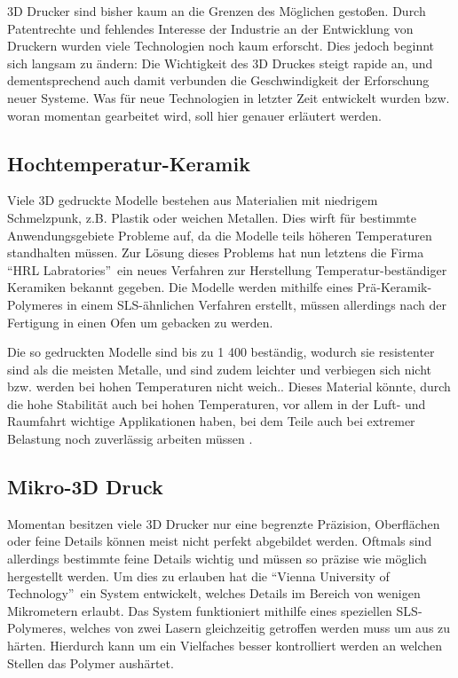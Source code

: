 3D Drucker sind bisher kaum an die Grenzen des Möglichen gestoßen. Durch Patentrechte und fehlendes Interesse der Industrie an der Entwicklung von Druckern wurden viele Technologien noch kaum erforscht. Dies jedoch beginnt sich langsam zu ändern: Die Wichtigkeit des 3D Druckes steigt rapide an, und dementsprechend auch damit verbunden die Geschwindigkeit der Erforschung neuer Systeme. Was für neue Technologien in letzter Zeit entwickelt wurden bzw. woran momentan gearbeitet wird, soll hier genauer erläutert werden.

\subsection{Hochtemperatur-Keramik}
Viele 3D gedruckte Modelle bestehen aus Materialien mit niedrigem Schmelzpunk, z.B. Plastik oder weichen Metallen. Dies wirft für bestimmte Anwendungsgebiete Probleme auf, da die Modelle teils höheren Temperaturen standhalten müssen. Zur Lösung dieses Problems hat nun letztens die Firma \textquotedblleft HRL Labratories\textquotedblright ~ein neues Verfahren zur Herstellung Temperatur-beständiger Keramiken bekannt gegeben. Die Modelle werden mithilfe eines Prä-Keramik-Polymeres in einem SLS-ähnlichen Verfahren erstellt, müssen allerdings nach der Fertigung in einen Ofen um gebacken zu werden.

Die so gedruckten Modelle sind bis zu 1 400 \TEMP beständig, wodurch sie resistenter sind als die meisten Metalle, und sind zudem leichter und verbiegen sich nicht bzw. werden bei hohen Temperaturen nicht weich.. 
Dieses Material könnte, durch die hohe Stabilität auch bei hohen Temperaturen, vor allem in der Luft- und Raumfahrt wichtige Applikationen haben, bei dem Teile auch bei extremer Belastung noch zuverlässig arbeiten müssen \parencite{HiTempCeram}.

\subsection{Mikro-3D Druck}
Momentan besitzen viele 3D Drucker nur eine begrenzte Präzision, Oberflächen oder feine Details können meist nicht perfekt abgebildet werden. Oftmals sind allerdings bestimmte feine Details wichtig und müssen so präzise wie möglich hergestellt werden. Um dies zu erlauben hat die \textquotedblleft Vienna University of Technology\textquotedblright ~ein System entwickelt, welches Details im Bereich von wenigen Mikrometern erlaubt.
Das System funktioniert mithilfe eines speziellen SLS-Polymeres, welches von zwei Lasern gleichzeitig getroffen werden muss um aus zu härten. Hierdurch kann um ein Vielfaches besser kontrolliert werden an welchen Stellen das Polymer aushärtet.

